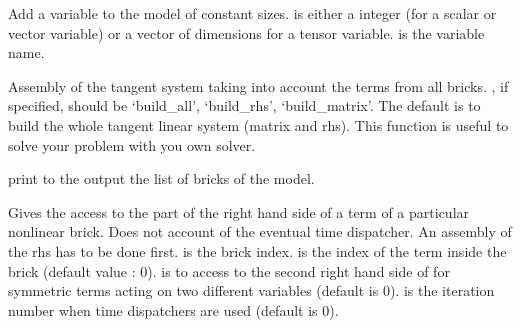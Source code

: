 \documentclass[a4paper,11pt,english]{sphinxmanual}
\begin{document}
\begin{fulllineitems}

\begin{fulllineitems}
\label{\detokenize{python/cmdref_Model:getfem.Model.add_variable}}
Add a variable to the model of constant sizes.  is either a
integer (for a scalar or vector variable) or a vector of dimensions
for a tensor variable.  is the variable name.

\end{fulllineitems}


\begin{fulllineitems}
\label{\detokenize{python/cmdref_Model:getfem.Model.assembly}}
Assembly of the tangent system taking into account the terms
from all bricks. , if specified, should be ‘build\_all’,
‘build\_rhs’, ‘build\_matrix’.
The default is to build the whole
tangent linear system (matrix and rhs). This function is useful
to solve your problem with you own solver.

\end{fulllineitems}


\begin{fulllineitems}
\label{\detokenize{python/cmdref_Model:getfem.Model.brick_list}}
print to the output the list of bricks of the model.

\end{fulllineitems}


\begin{fulllineitems}
\label{\detokenize{python/cmdref_Model:getfem.Model.brick_term_rhs}}
Gives the access to the part of the right hand side of a term
of a particular nonlinear brick. Does not account of the eventual
time dispatcher. An assembly of the rhs has to be done first.
 is the brick index.  is the index of the
term inside the brick (default value : 0).
 is to access to the second right hand side of for symmetric
terms acting on two different variables (default is 0).
 is the iteration number when time dispatchers are
used (default is 0).


\end{fulllineitems}
\end{fulllineitems}
\end{document}
